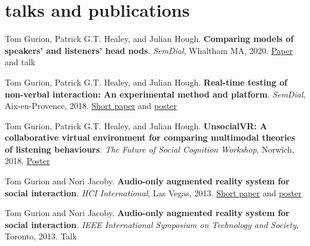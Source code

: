 \documentclass[]{friggeri-cv}
\begin{document}

\section{talks and \color{purple}pub\color{headercolor}lications}

\begin{entrylist}

  \publication
  {Tom Gurion, Patrick G.T. Healey, and Julian Hough. \textbf{Comparing models of speakers' and listeners' head nods}. \textit{SemDial}, Whaltham MA, 2020.}
  {\href{https://www.researchgate.net/publication/343628656_Comparing_models_of_speakers'_and_listeners'_head_nods}{Paper} and talk}

\end{entrylist}
\begin{entrylist}

  \publication
  {Tom Gurion, Patrick G.T. Healey, and Julian Hough. \textbf{Real-time testing of non-verbal interaction: An experimental method and platform}. \textit{SemDial}, Aix-en-Provence, 2018.}
  {\href{https://www.researchgate.net/publication/328874480_Real-time_testing_of_non-verbal_interaction_An_experimental_method_and_platform}{Short paper} and \href{http://www.tomgurion.me/pdfs/SemDial2018 poster.pdf}{poster}}

\end{entrylist}
\begin{entrylist}

  \publication
  {Tom Gurion, Patrick G.T. Healey, and Julian Hough. \textbf{UnsocialVR: A collaborative virtual environment for comparing multimodal theories of listening behaviours}. \textit{The Future of Social Cognition Workshop}, Norwich, 2018.}
  {\href{http://www.tomgurion.me/pdfs/FoSC2018 poster.pdf}{Poster}}

\end{entrylist}
\begin{entrylist}

  \publication
  {Tom Gurion and Nori Jacoby. \textbf{Audio-only augmented reality system for social interaction}. \textit{HCI International}, Las Vegas, 2013.}
  {\href{https://www.researchgate.net/publication/300874520_Audio-Only_Augmented_Reality_System_for_Social_Interaction}{Short paper} and \href{http://www.tomgurion.me/pdfs/HCI2013 poster.pdf}{poster}}

\end{entrylist}
\begin{entrylist}

  \publication
  {Tom Gurion and Nori Jacoby. \textbf{Audio-only augmented reality system for social interaction}. \textit{IEEE International Symposium on Technology and Society}, Toronto, 2013.}
  {Talk}

\end{entrylist}
\end{document}
